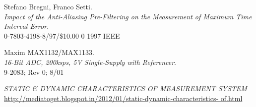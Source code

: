 \documentclass[conference, 11pt]{IEEEtran}
\begin{document}
\begin{thebibliography}{22}
Stefano Bregni, Franco Setti.\\
\textit{Impact of the Anti-Aliasing Pre-Filtering on the Measurement of Maximum Time Interval Error}. \\
0-7803-4198-8/97/\$10.00 0 1997 IEEE


Maxim MAX1132/MAX1133.\\
\textit{16-Bit ADC, 200ksps, 5V Single-Supply with Referencer}. \\
9-2083; Rev 0; 8/01




\textit{STATIC \& DYNAMIC CHARACTERISTICS OF MEASUREMENT SYSTEM}
\url{http://mediatoget.blogspot.in/2012/01/static-dynamic-characteristics- of.html}

\end{thebibliography}
\end{document}
